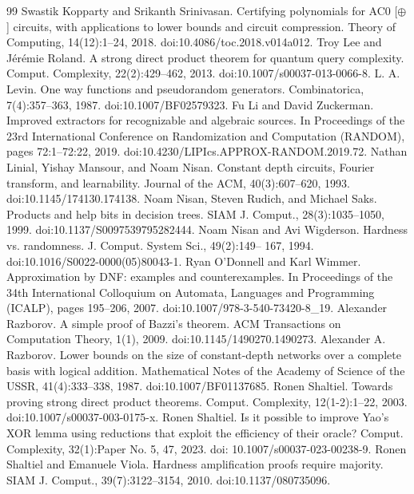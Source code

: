 \begin{thebibliography}{99}
 Swastik Kopparty and Srikanth Srinivasan. Certifying polynomials for AC0 [$\oplus$] circuits, with applications to lower bounds and circuit compression. Theory of Computing, 14(12):1–24, 2018. doi:10.4086/toc.2018.v014a012.
 Troy Lee and Jérémie Roland. A strong direct product theorem for quantum query complexity. Comput. Complexity, 22(2):429–462, 2013. doi:10.1007/s00037-013-0066-8.
 L. A. Levin. One way functions and pseudorandom generators. Combinatorica, 7(4):357–363, 1987. doi:10.1007/BF02579323.
 Fu Li and David Zuckerman. Improved extractors for recognizable and algebraic sources. In Proceedings of the 23rd International Conference on Randomization and Computation (RANDOM), pages 72:1–72:22, 2019. doi:10.4230/LIPIcs.APPROX-RANDOM.2019.72.
 Nathan Linial, Yishay Mansour, and Noam Nisan. Constant depth circuits, Fourier transform, and learnability. Journal of the ACM, 40(3):607–620, 1993. doi:10.1145/174130.174138.
 Noam Nisan, Steven Rudich, and Michael Saks. Products and help bits in decision trees. SIAM J. Comput., 28(3):1035–1050, 1999. doi:10.1137/S0097539795282444.
 Noam Nisan and Avi Wigderson. Hardness vs. randomness. J. Comput. System Sci., 49(2):149– 167, 1994. doi:10.1016/S0022-0000(05)80043-1.
 Ryan O’Donnell and Karl Wimmer. Approximation by DNF: examples and counterexamples. In Proceedings of the 34th International Colloquium on Automata, Languages and Programming (ICALP), pages 195–206, 2007. doi:10.1007/978-3-540-73420-8\_19.
 Alexander Razborov. A simple proof of Bazzi’s theorem. ACM Transactions on Computation Theory, 1(1), 2009. doi:10.1145/1490270.1490273.       
 Alexander A. Razborov. Lower bounds on the size of constant-depth networks over a complete basis with logical addition. Mathematical Notes of the Academy of Science of the USSR, 41(4):333–338, 1987. doi:10.1007/BF01137685.
 Ronen Shaltiel. Towards proving strong direct product theorems. Comput. Complexity, 12(1-2):1–22, 2003. doi:10.1007/s00037-003-0175-x.
 Ronen Shaltiel. Is it possible to improve Yao’s XOR lemma using reductions that exploit the efficiency of their oracle? Comput. Complexity, 32(1):Paper No. 5, 47, 2023. doi: 10.1007/s00037-023-00238-9.
 Ronen Shaltiel and Emanuele Viola. Hardness amplification proofs require majority. SIAM J. Comput., 39(7):3122–3154, 2010. doi:10.1137/080735096.

\end{thebibliography}
